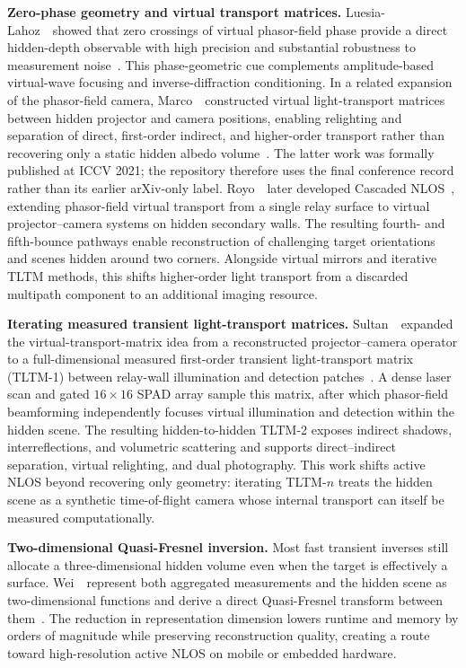 \vspace{0.8mm}
\noindent \textbf{Zero-phase geometry and virtual transport matrices.}
Luesia-Lahoz~\etal~showed that zero crossings of virtual phasor-field phase provide a direct hidden-depth observable with high precision and substantial robustness to measurement noise~\cite{luesiaZeroPhasePhasor2025}. This phase-geometric cue complements amplitude-based virtual-wave focusing and inverse-diffraction conditioning. In a related expansion of the phasor-field camera, Marco~\etal~constructed virtual light-transport matrices between hidden projector and camera positions, enabling relighting and separation of direct, first-order indirect, and higher-order transport rather than recovering only a static hidden albedo volume~\cite{marcoVirtualLightTransport2021}. The latter work was formally published at ICCV 2021; the repository therefore uses the final conference record rather than its earlier arXiv-only label.
Royo~\etal~later developed Cascaded NLOS~\cite{Royo2026Cascaded}, extending phasor-field virtual transport from a single relay surface to virtual projector--camera systems on hidden secondary walls. The resulting fourth- and fifth-bounce pathways enable reconstruction of challenging target orientations and scenes hidden around two corners. Alongside virtual mirrors and iterative TLTM methods, this shifts higher-order light transport from a discarded multipath component to an additional imaging resource.

\vspace{0.8mm}
\noindent \textbf{Iterating measured transient light-transport matrices.}
Sultan~\etal~expanded the virtual-transport-matrix idea from a reconstructed projector--camera operator to a full-dimensional measured first-order transient light-transport matrix (TLTM-1) between relay-wall illumination and detection patches~\cite{sultanIteratingTLTM2026}. A dense laser scan and gated $16\times16$ SPAD array sample this matrix, after which phasor-field beamforming independently focuses virtual illumination and detection within the hidden scene. The resulting hidden-to-hidden TLTM-2 exposes indirect shadows, interreflections, and volumetric scattering and supports direct--indirect separation, virtual relighting, and dual photography. This work shifts active NLOS beyond recovering only geometry: iterating TLTM-$n$ treats the hidden scene as a synthetic time-of-flight camera whose internal transport can itself be measured computationally.

\vspace{0.8mm}
\noindent \textbf{Two-dimensional Quasi-Fresnel inversion.}
Most fast transient inverses still allocate a three-dimensional hidden volume even when the target is effectively a surface. Wei~\etal~represent both aggregated measurements and the hidden scene as two-dimensional functions and derive a direct Quasi-Fresnel transform between them~\cite{weiQuasiFresnelNLOS2025}. The reduction in representation dimension lowers runtime and memory by orders of magnitude while preserving reconstruction quality, creating a route toward high-resolution active NLOS on mobile or embedded hardware.

